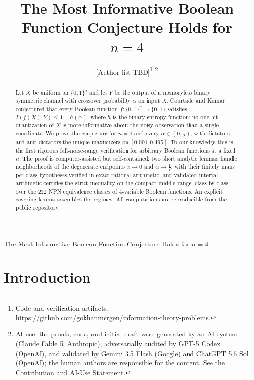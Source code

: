\documentclass[12pt,draftclsnofoot,onecolumn,journal]{IEEEtran}
\title{The Most Informative Boolean Function Conjecture Holds for $n = 4$}
\author{%
  [Author list TBD]\thanks{%
  Code and verification artifacts:
  \url{https://github.com/gokhanmergen/information-theory-problems}.}%
\thanks{AI use: the proofs, code, and initial draft were generated by an AI
system (Claude Fable 5, Anthropic), adversarially audited by GPT-5 Codex
(OpenAI), and validated by Gemini 3.5 Flash (Google) and ChatGPT 5.6 Sol
(OpenAI); the human authors are responsible for the content. See the
Contribution and AI-Use Statement.}}
\begin{document}
%
{The Most Informative Boolean Function Conjecture Holds for $n=4$}

\maketitle

\begin{abstract}
Let $X$ be uniform on $\{0,1\}^n$ and let $Y$ be the output of a memoryless
binary symmetric channel with crossover probability $\alpha$ on input $X$.
Courtade and Kumar conjectured that every Boolean function
$f:\{0,1\}^n\to\{0,1\}$ satisfies $I(f(X);Y)\le 1-h(\alpha)$, where $h$ is the
binary entropy function: no one-bit quantization of $X$ is more informative
about the noisy observation than a single coordinate. We prove the conjecture
for $n=4$ and every $\alpha\in(0,\tfrac12)$, with dictators and anti-dictators
the unique maximizers on $[0.001,0.495]$. To our knowledge this is the first
rigorous full-noise-range verification for arbitrary Boolean functions at a
fixed $n$. The proof is computer-assisted but self-contained: two short
analytic lemmas handle neighborhoods of the degenerate endpoints
$\alpha\to0$ and $\alpha\to\tfrac12$, with their finitely many per-class
hypotheses verified in exact rational arithmetic, and validated interval
arithmetic certifies the strict inequality on the compact middle range, class
by class over the $222$ NPN equivalence classes of $4$-variable Boolean
functions. An explicit covering lemma assembles the regimes. All computations
are reproducible from the public repository.
\end{abstract}

\IEEEpeerreviewmaketitle

\section{Introduction}
\end{document}
